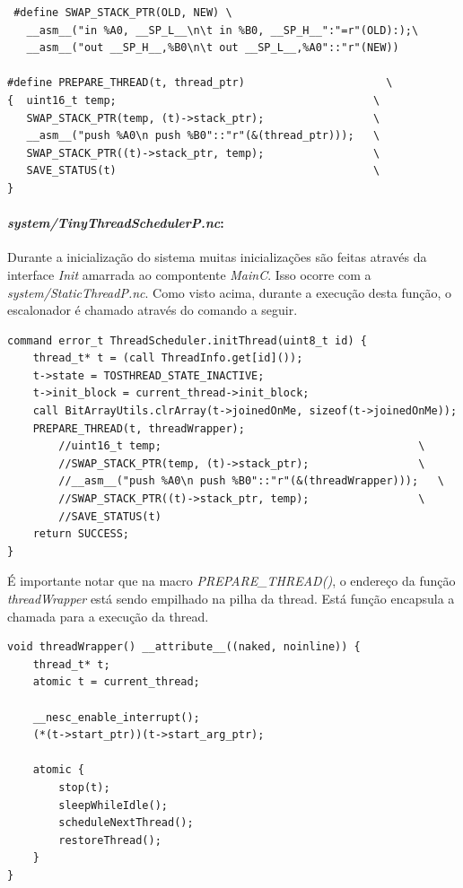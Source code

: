\documentclass[a4paper, 10pt]{article}
\begin{document}
\begin{lstlisting}
 #define SWAP_STACK_PTR(OLD, NEW) \
   __asm__("in %A0, __SP_L__\n\t in %B0, __SP_H__":"=r"(OLD):);\
   __asm__("out __SP_H__,%B0\n\t out __SP_L__,%A0"::"r"(NEW))
 
#define PREPARE_THREAD(t, thread_ptr)                      \
{  uint16_t temp;                                        \
   SWAP_STACK_PTR(temp, (t)->stack_ptr);                 \
   __asm__("push %A0\n push %B0"::"r"(&(thread_ptr)));   \
   SWAP_STACK_PTR((t)->stack_ptr, temp);                 \
   SAVE_STATUS(t)                                        \
}
\end{lstlisting}

\paragraph{\textit{system/TinyThreadSchedulerP.nc}:}
Durante a inicialização do sistema muitas inicializações são feitas através da interface \textit{Init} amarrada ao
compontente \textit{MainC}. Isso ocorre com a \textit{system/StaticThreadP.nc}. Como visto acima, durante a execução
desta função, o escalonador é chamado através do comando a seguir.
\begin{lstlisting}
command error_t ThreadScheduler.initThread(uint8_t id) {
    thread_t* t = (call ThreadInfo.get[id]());
    t->state = TOSTHREAD_STATE_INACTIVE;
    t->init_block = current_thread->init_block;
    call BitArrayUtils.clrArray(t->joinedOnMe, sizeof(t->joinedOnMe));
    PREPARE_THREAD(t, threadWrapper);
        //uint16_t temp;                                        \
        //SWAP_STACK_PTR(temp, (t)->stack_ptr);                 \
        //__asm__("push %A0\n push %B0"::"r"(&(threadWrapper)));   \
        //SWAP_STACK_PTR((t)->stack_ptr, temp);                 \
        //SAVE_STATUS(t)   
    return SUCCESS;
}
\end{lstlisting}
É importante notar que na macro \textit{PREPARE\_THREAD()}, o endereço da função \textit{threadWrapper} está sendo
empilhado na pilha da thread. Está função encapsula a chamada para a execução da thread.
\begin{lstlisting}
void threadWrapper() __attribute__((naked, noinline)) {
    thread_t* t;
    atomic t = current_thread;

    __nesc_enable_interrupt();
    (*(t->start_ptr))(t->start_arg_ptr);

    atomic {
        stop(t);
        sleepWhileIdle();
        scheduleNextThread();
        restoreThread();
    }
}
\end{lstlisting}
\end{document}
